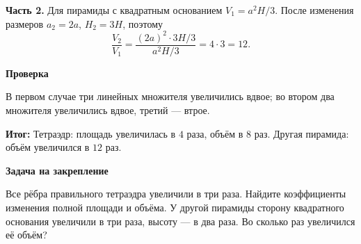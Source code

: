 \documentclass[a4paper,12pt]{article}
\newcommand{\sub}[1]{\par\smallskip\textbf{\color{darkaccent}#1}\par}
\newcommand{\result}[1]{\par\textcolor{teal!60!black}{\textbf{Итог:}} #1\par}
\begin{document}
\textbf{Часть 2.} Для пирамиды с квадратным основанием $V_1=a^2H/3$. После изменения размеров $a_2=2a$, $H_2=3H$, поэтому
\[\frac{V_2}{V_1}=\frac{(2a)^2\cdot3H/3}{a^2H/3}=4\cdot3=12.\]
\sub{Проверка} В первом случае три линейных множителя увеличились вдвое; во втором два множителя увеличились вдвое, третий --- втрое.
\result{Тетраэдр: площадь увеличилась в $4$ раза, объём в $8$ раз. Другая пирамида: объём увеличился в $12$ раз.}
\sub{Задача на закрепление} Все рёбра правильного тетраэдра увеличили в три раза. Найдите коэффициенты изменения полной площади и объёма. У другой пирамиды сторону квадратного основания увеличили в три раза, высоту --- в два раза. Во сколько раз увеличился её объём?
\end{document}
